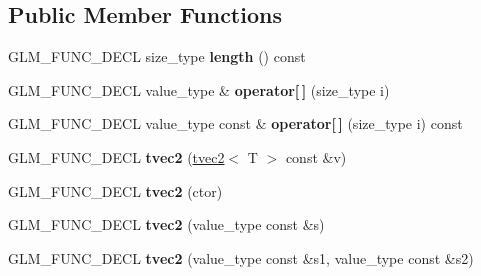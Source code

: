 \subsection*{\-Public \-Member \-Functions}
\begin{DoxyCompactItemize}
\item 
\hypertarget{structglm_1_1detail_1_1tvec2_ab6c8c9f40678f59192bd9cae5d462f12}{\-G\-L\-M\-\_\-\-F\-U\-N\-C\-\_\-\-D\-E\-C\-L size\-\_\-type {\bfseries length} () const }\label{structglm_1_1detail_1_1tvec2_ab6c8c9f40678f59192bd9cae5d462f12}

\item 
\hypertarget{structglm_1_1detail_1_1tvec2_abd2093679b295f0c184726c010f723e1}{\-G\-L\-M\-\_\-\-F\-U\-N\-C\-\_\-\-D\-E\-C\-L value\-\_\-type \& {\bfseries operator\mbox{[}$\,$\mbox{]}} (size\-\_\-type i)}\label{structglm_1_1detail_1_1tvec2_abd2093679b295f0c184726c010f723e1}

\item 
\hypertarget{structglm_1_1detail_1_1tvec2_aa3aece5c9e3a8239e95e748974bcf2c5}{\-G\-L\-M\-\_\-\-F\-U\-N\-C\-\_\-\-D\-E\-C\-L value\-\_\-type const \& {\bfseries operator\mbox{[}$\,$\mbox{]}} (size\-\_\-type i) const }\label{structglm_1_1detail_1_1tvec2_aa3aece5c9e3a8239e95e748974bcf2c5}

\item 
\hypertarget{structglm_1_1detail_1_1tvec2_a538a7f92f8c9b22ac624226ea1f48e3a}{\-G\-L\-M\-\_\-\-F\-U\-N\-C\-\_\-\-D\-E\-C\-L {\bfseries tvec2} (\hyperlink{structglm_1_1detail_1_1tvec2}{tvec2}$<$ \-T $>$ const \&v)}\label{structglm_1_1detail_1_1tvec2_a538a7f92f8c9b22ac624226ea1f48e3a}

\item 
\hypertarget{structglm_1_1detail_1_1tvec2_a17c66b75e5ad0d2c5c6c2cedd67dd4a8}{\-G\-L\-M\-\_\-\-F\-U\-N\-C\-\_\-\-D\-E\-C\-L {\bfseries tvec2} (ctor)}\label{structglm_1_1detail_1_1tvec2_a17c66b75e5ad0d2c5c6c2cedd67dd4a8}

\item 
\hypertarget{structglm_1_1detail_1_1tvec2_acc4a526f25f000d09ae31159e5e9069f}{\-G\-L\-M\-\_\-\-F\-U\-N\-C\-\_\-\-D\-E\-C\-L {\bfseries tvec2} (value\-\_\-type const \&s)}\label{structglm_1_1detail_1_1tvec2_acc4a526f25f000d09ae31159e5e9069f}

\item 
\hypertarget{structglm_1_1detail_1_1tvec2_a3da5a34afeb3d8aa42ffc449e51ce3a1}{\-G\-L\-M\-\_\-\-F\-U\-N\-C\-\_\-\-D\-E\-C\-L {\bfseries tvec2} (value\-\_\-type const \&s1, value\-\_\-type const \&s2)}\label{structglm_1_1detail_1_1tvec2_a3da5a34afeb3d8aa42ffc449e51ce3a1}


\end{DoxyCompactItemize}
